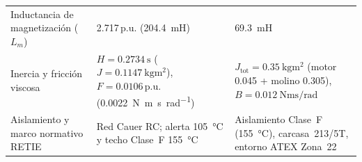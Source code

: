 \begin{table}[!t]
\begin{tabularx}{\textwidth}{@{} >{\raggedright\arraybackslash}p{4.3cm} >{\raggedright\arraybackslash}X >{\raggedright\arraybackslash}X @{}}
Inductancia de magnetización ($L_m$) & \num{2.717}\,p.u. (\qty{204.4}{\milli\henry}) & \qty{69.3}{\milli\henry} \\
Inercia y fricción viscosa & $H=\qty{0.2734}{\second}$ ($J=\qty{0.1147}{\kilogram\meter\squared}$), $F=\num{0.0106}\,\text{p.u.}$ (\qty{0.0022}{\newton\meter\second\per\radian}) & $J_{\text{tot}}=\qty{0.35}{\kilogram\meter\squared}$ (motor \num{0.045} + molino \num{0.305}), $B=\qty{0.012}{\newton\meter\second\per\radian}$ \\
Aislamiento y marco normativo RETIE & Red Cauer RC; alerta \qty{105}{\celsius} y techo Clase~F \qty{155}{\celsius}~\cite{RETIE2024,RETIE2026} & Aislamiento Clase~F (\qty{155}{\celsius}), carcasa~213/5T, entorno ATEX Zona~22~\cite{NFPA61,RETIE2026} \\
\bottomrule
\end{tabularx}
\endgroup
\end{table}

